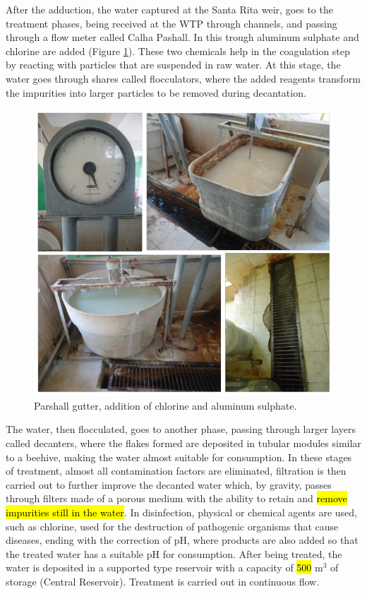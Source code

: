 \documentclass{singlecol}
\theoremstyle{TH}{
\newtheorem{lemma}{Lemma}
\newtheorem{theorem}[lemma]{Theorem}
\newtheorem{corrolary}[lemma]{Corrolary}
\newtheorem{conjecture}[lemma]{Conjecture}
\newtheorem{proposition}[lemma]{Proposition}
\newtheorem{claim}[lemma]{Claim}
\newtheorem{stheorem}[lemma]{Wrong Theorem}
\newtheorem{algorithm}{Algorithm}
}
\theoremstyle{THrm}{
\newtheorem{definition}{Definition}[section]
\newtheorem{question}{Question}[section]
\newtheorem{remark}{Remark}
\newtheorem{scheme}{Scheme}
}
\theoremstyle{THhit}{
\newtheorem{case}{Case}[section]
}
\begin{document}
After the adduction, the water captured at the Santa Rita weir, goes to the treatment phases, being received at the WTP through channels, and passing through a flow meter called Calha Pashall. In this trough aluminum sulphate and chlorine are added (Figure \ref{fig:WTPParshall}). These two chemicals help in the coagulation step by reacting with particles that are suspended in raw water. At this stage, the water goes through shares called flocculators, where the added reagents transform the impurities into larger particles to be removed during decantation. 

\begin{figure}[h]
\caption{Parshall gutter, addition of chlorine and aluminum sulphate.}
\label{fig:WTPParshall}
\centering
\includegraphics[width=\textwidth]{figures/calhaPashall.png}
\end{figure}

The water, then flocculated, goes to another phase, passing through larger layers called decanters, where the flakes formed are deposited in tubular modules similar to a beehive, making the water almost suitable for consumption. In these stages of treatment, almost all contamination factors are eliminated, filtration is then carried out to further improve the decanted water which, by gravity, passes through filters made of a porous medium with the ability to retain and \label{firstChange}{\hl{remove impurities still in the water}}. In disinfection, physical or chemical agents are used, such as chlorine, used for the destruction of pathogenic organisms that cause diseases, ending with the correction of pH, where products are also added so that the treated water has a suitable pH for consumption. After being treated, the water is deposited in a supported type reservoir with a capacity of \hl{500} m$^3$ of storage (Central Reservoir). Treatment is carried out in continuous flow. 
\end{document}
